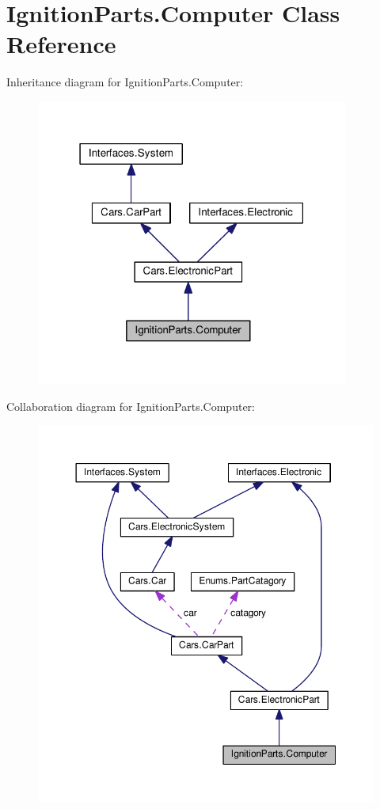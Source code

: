 \hypertarget{classIgnitionParts_1_1Computer}{}\section{Ignition\+Parts.\+Computer Class Reference}
\label{classIgnitionParts_1_1Computer}


Inheritance diagram for Ignition\+Parts.\+Computer\+:\nopagebreak
\begin{figure}[H]
\begin{center}
\leavevmode
\includegraphics[width=291pt]{classIgnitionParts_1_1Computer__inherit__graph}
\end{center}
\end{figure}


Collaboration diagram for Ignition\+Parts.\+Computer\+:\nopagebreak
\begin{figure}[H]
\begin{center}
\leavevmode
\includegraphics[width=350pt]{classIgnitionParts_1_1Computer__coll__graph}
\end{center}
\end{figure}
